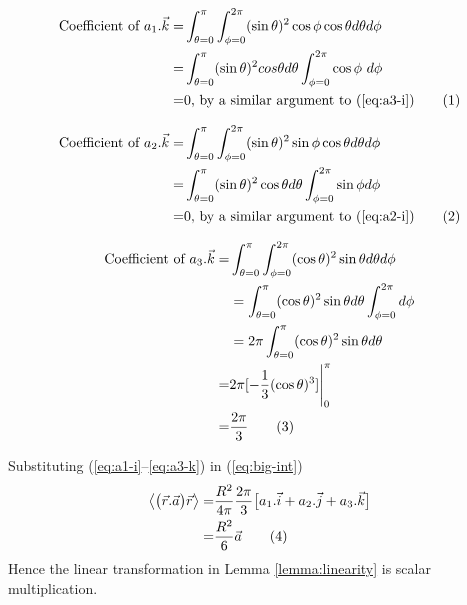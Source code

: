 \documentclass[]{article}
\newcommand\numberthis{\addtocounter{equation}{1}\tag{\theequation}}
\begin{document}
\begin{align*}
\text{Coefficient of }a_1.\vec{k} =&\int_{\theta=0}^{\pi}\int_{\phi=0}^{2\pi}(\sin\theta)^2\cos\phi\cos\theta d\theta d\phi\\=&
\int_{\theta=0}^{\pi}  (\sin\theta)^2 cos\theta d\theta \int_{\phi=0}^{2\pi}\cos\phi\ d\phi\\
=&0 \text{, by a similar argument to (\ref{eq:a3-i})} \numberthis \label{eq:a1-k}
\end{align*}

\begin{align*}
\text{Coefficient of }a_2.\vec{k} =&\int_{\theta=0}^{\pi}\int_{\phi=0}^{2\pi}(\sin\theta)^2\sin\phi\cos\theta d\theta d\phi\\=&
\int_{\theta=0}^{\pi} (\sin\theta)^2 \cos\theta d\theta \int_{\phi=0}^{2\pi}\sin\phi d\phi\\=&0 \text{, by a similar argument to (\ref{eq:a2-i})} \numberthis \label{eq:a2-k}
\end{align*}

\begin{align*}
\text{Coefficient of }a_3.\vec{k} =&\int_{\theta=0}^{\pi} \int_{\phi=0}^{2\pi} (\cos\theta)^2\sin\theta d\theta   d\phi\\ &= \int_{\theta=0}^{\pi} (\cos\theta)^2\sin\theta d\theta  \int_{\phi=0}^{2\pi} d\phi \\ &= 2 \pi \int_{\theta=0}^{\pi} (\cos\theta)^2\sin\theta d\theta \\
=& 2\pi[-\frac{1}{3}(\cos\theta)^3] \Bigg|_0^{\pi} \\
=& \frac{2\pi}{3}\numberthis \label{eq:a3-k}
\end{align*}

Substituting (\ref{eq:a1-i}--\ref{eq:a3-k})  in (\ref{eq:big-int})
\begin{align*}
\left\langle \big(\vec{r}.\vec{a}\big)\vec{r} \right\rangle=&\frac{ R^2}{4\pi}\frac{2\pi}{3}\big[a_1.\vec{i}+a_2.\vec{j}+a_3.\vec{k}\big]\\
=&\frac{R^2}{6}\vec{a} \numberthis \label{eq:final}
\end{align*}
Hence the linear transformation in Lemma \ref{lemma:linearity}  is scalar multiplication.
\end{document}

